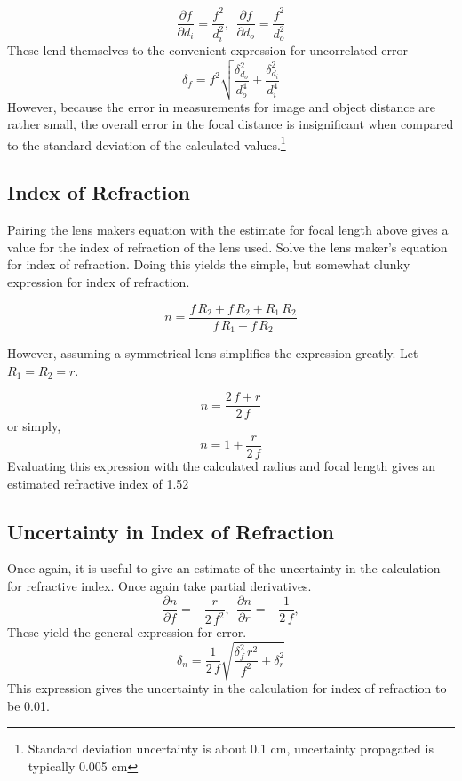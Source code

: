 \documentclass[]{article}
\begin{document}
\begin{equation}
	\frac{\partial f}{\partial d_i} = \frac{f^2}{d_i^2}, \ \ \frac{\partial f}{\partial d_o} = \frac{f^2}{d_o^2}
\end{equation}
These lend themselves to the convenient expression for uncorrelated error
\begin{equation}
	\delta_{f} = f^2 \sqrt{\frac{\delta_{d_o}^2}{d_o^4} + \frac{\delta_{d_i}^2}{d_i^4}}
\end{equation}
However, because the error in measurements for image and object distance are rather small, the overall error in the focal distance is insignificant when compared to the standard deviation of the calculated values.\footnote{Standard deviation uncertainty is about 0.1 cm, uncertainty propagated is typically 0.005 cm}
\subsection{Index of Refraction}
Pairing the lens makers equation with the estimate for focal length above gives a value for the index of refraction of the lens used. Solve the lens maker's equation for index of refraction. Doing this yields the simple, but somewhat clunky expression for index of refraction.

\begin{equation}
n = \frac{f \, R_2 + f \, R_2 + R_1 \, R_2}{f \, R_1 + f \,  R_2}
\end{equation}

However, assuming a symmetrical lens simplifies the expression greatly. Let \(R_1 = R_2 = r\).

\begin{equation}
n = \frac{2\, f + r}{2 \, f}
\end{equation}
or simply,
\begin{equation}
n = 1 + \frac {r}{2 \, f}
\end{equation}
Evaluating this expression with the calculated radius and focal length gives an estimated refractive index of 1.52
\subsection{Uncertainty in Index of Refraction} 
Once again, it is useful to give an estimate of the uncertainty in the calculation for refractive index. Once again take partial derivatives.
\begin{equation}
\frac{\partial n}{\partial f} = -\frac{r}{2 \, f ^2}, \ \ \frac{\partial n}{\partial r} = -\frac{1}{2 \, f},
\end{equation}
These yield the general expression for error.
\begin{equation}
\delta_n = \frac{1}{2 \, f} \sqrt{\frac{\delta_f^2 \, r^2}{f^2} + \delta_r^2}
\end{equation}
This expression gives the uncertainty in the calculation for index of refraction to be 0.01.
\end{document}
